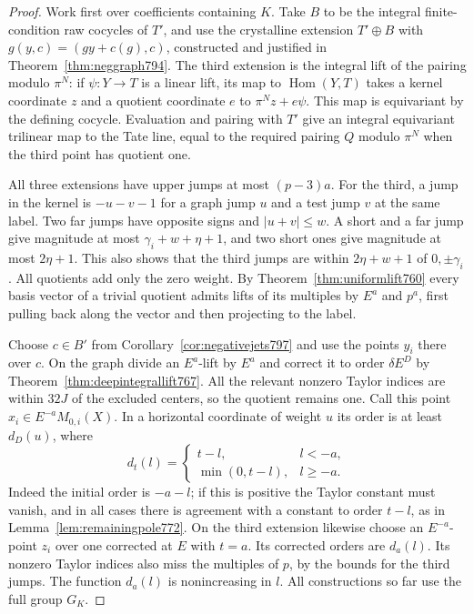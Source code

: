 \documentclass[a4paper,11pt]{article}
\theoremstyle{definition}
\theoremstyle{remark}
\numberwithin{equation}{section}
\begin{document}
\begin{proof}
Work first over coefficients containing \(K\). Take \(B\) to
be the integral finite-condition raw cocycles of \(T'\), and
use the crystalline extension \(T'\oplus B\) with
\(g(y,c)=(gy+c(g),c)\), constructed and justified in
Theorem~\ref{thm:neggraph794}. The third extension is the
integral lift of the pairing modulo \(\pi^N\): if
\(\psi:Y\to T\) is a linear lift, its map to
\(\operatorname{Hom}(Y,T)\) takes a kernel coordinate \(z\)
and a quotient coordinate \(e\) to \(\pi^Nz+e\psi\).
This map is equivariant by the defining cocycle. Evaluation
and pairing with \(T'\) give an integral equivariant trilinear
map to the Tate line, equal to the required pairing \(Q\)
modulo \(\pi^N\) when the third point has quotient one.

All three extensions have upper jumps at most \((p-3)a\).
For the third, a jump in the kernel is
\(-u-v-1\) for a graph jump \(u\) and a test jump \(v\)
at the same label. Two far jumps have opposite signs and
\(|u+v|\le w\). A short and a far jump give magnitude at
most \(\gamma_i+w+\eta+1\), and two short ones give
magnitude at most \(2\eta+1\). This also shows that the
third jumps are within \(2\eta+w+1\) of \(0,\pm\gamma_i\).
All quotients add only the zero weight. By
Theorem~\ref{thm:uniformlift760} every basis vector of a
trivial quotient admits lifts of its multiples by \(E^a\)
and \(p^a\), first pulling back along the vector and then
projecting to the label.

Choose \(c\in B'\) from Corollary~\ref{cor:negativejets797}
and use the points \(y_i\) there over \(c\). On the graph
divide an \(E^a\)-lift by \(E^a\) and correct it to order
\(\delta E^D\) by Theorem~\ref{thm:deepintegrallift767}.
All the relevant nonzero Taylor indices are within \(32J\)
of the excluded centers, so the quotient remains one.
Call this point \(x_i\in E^{-a}M_{0,i}(X)\). In a horizontal
coordinate of weight \(u\) its order is at least \(d_D(u)\),
where
\[
     d_t(l)=
       \begin{cases}
         t-l,& l<-a,\\
         \min(0,t-l),& l\ge-a .
       \end{cases}
\]
Indeed the initial order is \(-a-l\); if this is positive
the Taylor constant must vanish, and in all cases there
is agreement with a constant to order \(t-l\), as in
Lemma~\ref{lem:remainingpole772}. On the third extension
likewise choose an \(E^{-a}\)-point \(z_i\) over one
corrected at \(E\) with \(t=a\). Its corrected orders
are \(d_a(l)\). Its nonzero Taylor indices also miss the
multiples of \(p\), by the bounds for the third jumps.
The function \(d_a(l)\) is nonincreasing in \(l\).
All constructions so far use the full group \(G_K\).


\end{proof}
\end{document}
